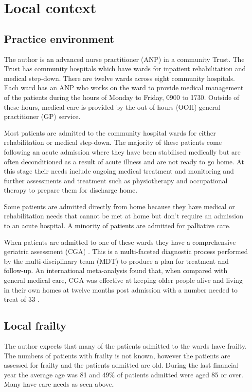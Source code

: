 \documentclass
[
	12pt,
	a4paper,
	oneside,
]{report}
\begin{document}
\section{Local context}

\subsection{Practice environment}

The author is an advanced nurse practitioner (ANP) in a community Trust.
The Trust has community hospitals which have wards for inpatient rehabilitation and
medical step-down. There are twelve wards across eight community hospitals. Each ward has
an ANP who works on the ward to provide medical management of the patients during 
the hours of Monday to Friday, 0900 to 1730. Outside of these hours, medical care 
is provided by the out of hours (OOH) general practitioner (GP) service. 

Most patients are admitted to the community hospital wards for either rehabilitation
or medical step-down. The majority of these patients come following an acute admission
where they have been stabilised medically but are often deconditioned as a result
of acute illness and are not ready to go home. At this stage their needs include 
ongoing medical treatment and monitoring and further assessments and treatment such 
as physiotherapy and occupational therapy to prepare them for discharge home.

Some patients are admitted directly from home because they have medical or rehabilitation
needs that cannot be met at home but don't require an admission to an acute hospital.
A minority of patients are admitted for palliative care.

When patients are admitted to one of these wards they have a comprehensive geriatric 
assessment (CGA) \parencite{bgs:14}. This is a multi-faceted diagnostic process
performed by the multi-disciplinary team (MDT) to produce a plan for treatment 
and follow-up.
An international meta-analysis found that, when compared with general medical care,
CGA was effective at keeping older people alive and living in their own homes at
twelve months post admission with a number needed to treat of 33 \parencite{ellis:11}.

\subsection{Local frailty}

The author expects that many of the patients admitted to the wards have frailty.
The numbers of patients with frailty is not known, however the patients are assessed 
for frailty and the patients admitted are old. During the last financial year the
average age was 81 and 49\% of patients admitted were aged 85 or over. Many have 
care needs as seen above.
\end{document}
